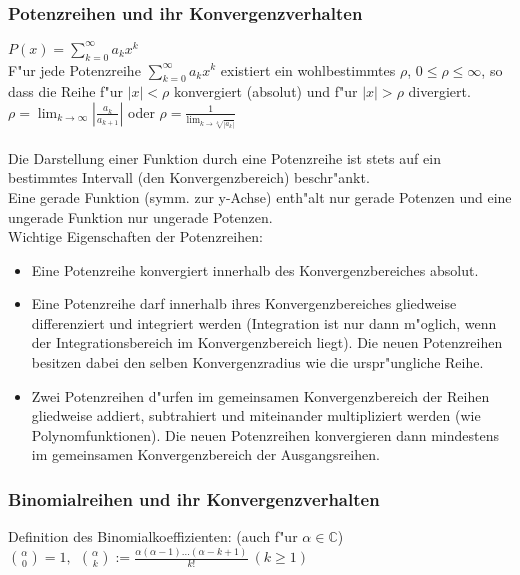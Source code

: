 \documentclass[10pt, a4paper, twocolumn]{scrartcl}
\begin{document}
\subsubsection{Potenzreihen und ihr Konvergenzverhalten}

$P(x)=\sum^\infty_{k=0}a_kx^k$\\

F"ur jede Potenzreihe $\sum^{\infty}_{k=0}a_kx^k$ existiert ein wohlbestimmtes $\rho$, $0 \leq \rho \leq \infty$, so dass die Reihe f"ur $|x| < \rho$ konvergiert (absolut) und f"ur $|x| > \rho$ divergiert.\\

$\rho=\lim_{k\rightarrow\infty}|\frac{a_k}{a_{k+1}}|$ oder $\rho=\frac{1}{\lim_{k\rightarrow \sqrt[k]{|a_k|}}}$\\\\

Die Darstellung einer Funktion durch eine Potenzreihe ist stets auf ein bestimmtes Intervall (den Konvergenzbereich) beschr"ankt.\\
Eine gerade Funktion (symm. zur y-Achse) enth"alt nur gerade Potenzen und eine ungerade Funktion nur ungerade Potenzen.\\

Wichtige Eigenschaften der Potenzreihen:
\begin{itemize}
 \item Eine Potenzreihe konvergiert innerhalb des Konvergenzbereiches absolut.
 \item Eine Potenzreihe darf innerhalb ihres Konvergenzbereiches gliedweise differenziert und integriert werden (Integration ist nur dann m"oglich, wenn der Integrationsbereich im Konvergenzbereich liegt). Die neuen Potenzreihen besitzen dabei den selben Konvergenzradius wie die urspr"ungliche Reihe.
 \item Zwei Potenzreihen d"urfen im gemeinsamen Konvergenzbereich der Reihen gliedweise addiert, subtrahiert und miteinander multipliziert werden (wie Polynomfunktionen). Die neuen Potenzreihen konvergieren dann mindestens im gemeinsamen Konvergenzbereich der Ausgangsreihen.
\end{itemize}

\subsubsection{Binomialreihen und ihr Konvergenzverhalten}

Definition des Binomialkoeffizienten: (auch f"ur $\alpha \in \mathbb{C}$)\\
$\binom{\alpha}{0}=1,\:\:\binom{\alpha}{k}:=\frac{\alpha(\alpha-1)\ldots(\alpha-k+1)}{k!}\: (k\geq 1)$\\
\end{document}

